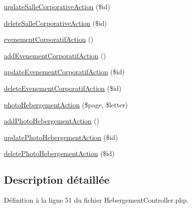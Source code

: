 \begin{DoxyCompactItemize}
\hyperlink{class_my_app_1_1_admin_bundle_1_1_controller_1_1_hebergement_controller_afecc0acc8824eeb43fb36e1f25739e6e}{update\-Salle\-Corporative\-Action} (\$id)
\item 
\hyperlink{class_my_app_1_1_admin_bundle_1_1_controller_1_1_hebergement_controller_a1b0e98edba7bfa65e2d3eebc6be7fd80}{delete\-Salle\-Corporative\-Action} (\$id)
\item 
\hyperlink{class_my_app_1_1_admin_bundle_1_1_controller_1_1_hebergement_controller_a9c164727b403ba985d378cdaafe93626}{evenement\-Corporatif\-Action} ()
\item 
\hyperlink{class_my_app_1_1_admin_bundle_1_1_controller_1_1_hebergement_controller_a1d887f24a3ee0882f16623ab5c07518e}{add\-Evenement\-Corporatif\-Action} ()
\item 
\hyperlink{class_my_app_1_1_admin_bundle_1_1_controller_1_1_hebergement_controller_a5dbd9620b6984b3a7e0d449d6e73cca5}{update\-Evenement\-Corporatif\-Action} (\$id)
\item 
\hyperlink{class_my_app_1_1_admin_bundle_1_1_controller_1_1_hebergement_controller_afc25a14cfab495bef5a31db4d778a0c3}{delete\-Evenement\-Corporatif\-Action} (\$id)
\item 
\hyperlink{class_my_app_1_1_admin_bundle_1_1_controller_1_1_hebergement_controller_ae60faa1abdf81093fb3470a7eaab8e02}{photo\-Hebergement\-Action} (\$page, \$letter)
\item 
\hyperlink{class_my_app_1_1_admin_bundle_1_1_controller_1_1_hebergement_controller_af1f080cfe1c062681849c09a63ae2935}{add\-Photo\-Hebergement\-Action} ()
\item 
\hyperlink{class_my_app_1_1_admin_bundle_1_1_controller_1_1_hebergement_controller_af55170ed4a4b503b0a3429a64f692c05}{update\-Photo\-Hebergement\-Action} (\$id)
\item 
\hyperlink{class_my_app_1_1_admin_bundle_1_1_controller_1_1_hebergement_controller_a15fb671a0f85f049039d6888293b6a1f}{delete\-Photo\-Hebergement\-Action} (\$id)
\end{DoxyCompactItemize}


\subsection{Description détaillée}


Définition à la ligne 51 du fichier Hebergement\-Controller.\-php.




